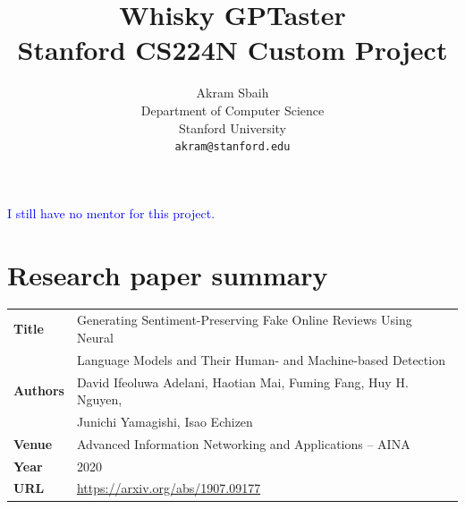 \documentclass{article}
\title{
  Whisky GPTaster \\
  \vspace{1em}
  \small{\normalfont Stanford CS224N Custom Project}  %
}
\author{
  Akram Sbaih \\
  Department of Computer Science \\
  Stanford University \\
  \texttt{akram@stanford.edu} \\
}
\newcommand{\note}[1]{\textcolor{blue}{{#1}}}
\begin{document}
\maketitle




\note{I still have no mentor for this project.}

%


\section{Research paper summary}

\begin{table}[h]
    \centering
    \begin{tabular}{ll}
        \toprule
        \textbf{Title} & Generating Sentiment-Preserving Fake Online Reviews Using Neural \\ &  Language Models and Their Human- and  Machine-based Detection \\
        \midrule
        \textbf{Authors} & David Ifeoluwa Adelani,  Haotian Mai,  Fuming Fang,  Huy H. Nguyen,  \\& Junichi Yamagishi,  Isao Echizen \\
        \textbf{Venue} & Advanced Information Networking and Applications -- AINA \\
        \textbf{Year}  & 2020 \\
        \textbf{URL}   & \url{https://arxiv.org/abs/1907.09177} \\
        \bottomrule
    \end{tabular}
    \vspace{1em}
\end{table}
\end{document}

